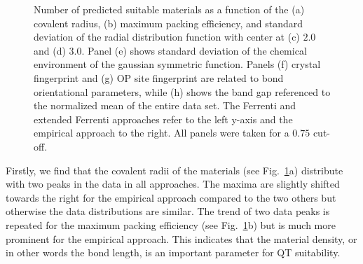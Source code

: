 \documentclass[superscriptaddress,unsortedaddress,
 amsmath,amssymb,
 aps,
]{revtex4-2}
\begin{document}
\begin{figure}[ht!]\ContinuedFloat
\begin{subfigure}[b]{0.45\textwidth}
    \scalebox{0.85}{}
    \subcaption{}
\end{subfigure}
\begin{subfigure}[b]{0.45\textwidth}
    \scalebox{0.85}{}
    \subcaption{}
\end{subfigure}%

\begin{subfigure}[b]{0.45\textwidth}
    \scalebox{0.85}{}
    \subcaption{}
\end{subfigure}
\begin{subfigure}[b]{0.45\textwidth}
    \scalebox{0.85}{}
    \subcaption{}
\end{subfigure}
\caption{Number of predicted suitable materials as a function of the (a) covalent radius, (b) maximum packing efficiency, and standard deviation of the radial distribution function with center at (c) $2.0$ and (d) $3.0$. Panel (e) shows standard deviation of the chemical environment of the gaussian symmetric function. Panels (f) crystal fingerprint and (g) OP site fingerprint are related to bond orientational parameters, while (h) shows the band gap referenced to the normalized mean of the entire data set. 
The Ferrenti and extended Ferrenti approaches refer to the left y-axis and the empirical approach to the right. All panels were taken for a $0.75$ cut-off. }
\label{fig:histograms_supp}
\end{figure}


Firstly, we find that the covalent radii of the materials (see Fig.~\ref{fig:histograms_supp}a) distribute with two peaks in the data in all approaches. The maxima are slightly shifted towards the right for the empirical approach compared to the two others but otherwise the data distributions are similar. The trend of two data peaks is repeated for the maximum packing efficiency (see Fig.~\ref{fig:histograms_supp}b) but is much more prominent for the empirical approach. This indicates that the material density, or in other words the bond length, is an important parameter for QT suitability.  

\end{document}
